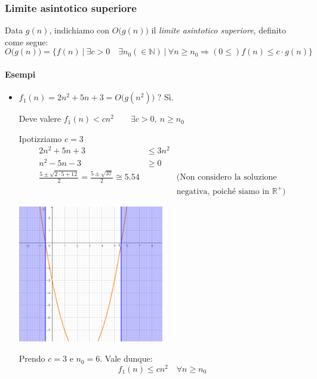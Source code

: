\subsubsection{Limite asintotico superiore}
Data $g(n)$, indichiamo con $O \big(g(n) \big)$ il \emph{limite asintotico superiore}, definito come segue:
\begin{displaymath}
	O \big(g(n) \big) = \{ f(n) \ \vert \ \exists c > 0 \quad \exists n_0 (\in \mathbb{N}) \ \vert \ \forall n \geq n_0 \Rightarrow (0 \leq) f(n) \leq c \cdot g(n) \}
\end{displaymath}

\paragraph{Esempi}
\begin{itemize}
	\item $f_1(n) = 2n^2 + 5n + 3 = O \big(g(n^2) \big)$ ? Sì. \par
	Deve valere $f_1(n) < cn^2 \qquad \exists c > 0, \ n \geq n_0$ \par
	Ipotizziamo $c = 3$
	\begin{align*}
		2n^2 + 5n + 3 & \leq 3n^2 \\
		n^2 - 5n - 3 & \geq 0 \\
		\frac{5 \pm \sqrt{2 \cdot 5 + 12}}{2} = \frac{5 \pm \sqrt{37}}{2} \cong 5.54 && \text{(Non considero la soluzione} \\ && \text{negativa, poiché siamo in } \mathbb{R}^+ \text{)}
	\end{align*}
	\begin{center}
		\includegraphics[height=6cm]{img/parabola-plot1.png}
	\end{center}
	
	Prendo $c = 3$ e $n_0 = 6$. Vale dunque:
	\begin{displaymath}
		f_1(n) \leq cn^2 \quad \forall n \geq n_0
	\end{displaymath}


\end{itemize}

